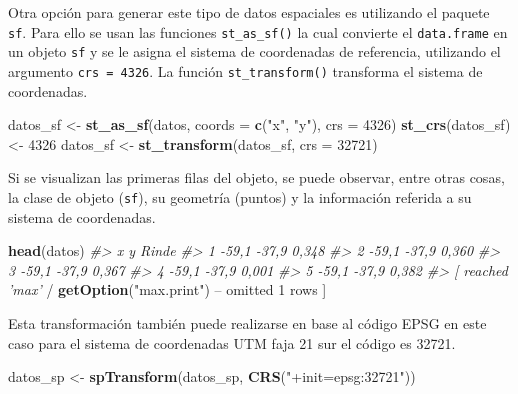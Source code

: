 \documentclass[11pt,b5paper,]{krantz}
\newenvironment{Shaded}{}{}
\newcommand{\CommentTok}[1]{\textcolor[rgb]{0.38,0.63,0.69}{\textit{#1}}}
\newcommand{\DataTypeTok}[1]{\textcolor[rgb]{0.56,0.13,0.00}{#1}}
\newcommand{\DecValTok}[1]{\textcolor[rgb]{0.25,0.63,0.44}{#1}}
\newcommand{\KeywordTok}[1]{\textcolor[rgb]{0.00,0.44,0.13}{\textbf{#1}}}
\newcommand{\NormalTok}[1]{#1}
\newcommand{\OperatorTok}[1]{\textcolor[rgb]{0.40,0.40,0.40}{#1}}
\newcommand{\StringTok}[1]{\textcolor[rgb]{0.25,0.44,0.63}{#1}}
\begin{document}
Otra opción para generar este tipo de datos espaciales es utilizando el paquete \texttt{sf}. Para ello se usan las funciones \texttt{st\_as\_sf()} la cual convierte el \texttt{data.frame} en un objeto \texttt{sf} y se le asigna el sistema de coordenadas de referencia, utilizando el argumento \texttt{crs\ =\ 4326}. La función \texttt{st\_transform()} transforma el sistema de coordenadas.

\begin{Shaded}
\begin{Highlighting}[]
\NormalTok{datos_sf <-}\StringTok{ }\KeywordTok{st_as_sf}\NormalTok{(datos, }
                     \DataTypeTok{coords =} \KeywordTok{c}\NormalTok{(}\StringTok{"x"}\NormalTok{, }\StringTok{"y"}\NormalTok{), }
                     \DataTypeTok{crs =} \DecValTok{4326}\NormalTok{)}
\KeywordTok{st_crs}\NormalTok{(datos_sf) <-}\StringTok{ }\DecValTok{4326}
\NormalTok{datos_sf <-}\StringTok{ }\KeywordTok{st_transform}\NormalTok{(datos_sf, }\DataTypeTok{crs =} \DecValTok{32721}\NormalTok{)}
\end{Highlighting}
\end{Shaded}

Si se visualizan las primeras filas del objeto, se puede observar, entre otras cosas, la clase de objeto (\texttt{sf}), su geometría (puntos) y la información referida a su sistema de coordenadas.

\begin{Shaded}
\begin{Highlighting}[]
\KeywordTok{head}\NormalTok{(datos)}
\CommentTok{#> x y Rinde}
\CommentTok{#> 1 -59,1 -37,9 0,348}
\CommentTok{#> 2 -59,1 -37,9 0,360}
\CommentTok{#> 3 -59,1 -37,9 0,367}
\CommentTok{#> 4 -59,1 -37,9 0,001}
\CommentTok{#> 5 -59,1 -37,9 0,382}
\CommentTok{#> [ reached 'max'}
    \OperatorTok{/}\StringTok{ }\KeywordTok{getOption}\NormalTok{(}\StringTok{"max.print"}\NormalTok{) }\OperatorTok{--}
\NormalTok{omitted }\DecValTok{1}\NormalTok{ rows ]}
\end{Highlighting}
\end{Shaded}

Esta transformación también puede realizarse en base al código EPSG en este caso para el sistema de coordenadas UTM faja 21 sur el código es 32721.

\begin{Shaded}
\begin{Highlighting}[]
\NormalTok{datos_sp <-}\StringTok{ }\KeywordTok{spTransform}\NormalTok{(datos_sp, }
                        \KeywordTok{CRS}\NormalTok{(}\StringTok{"+init=epsg:32721"}\NormalTok{))}
\end{Highlighting}
\end{Shaded}
\end{document}
